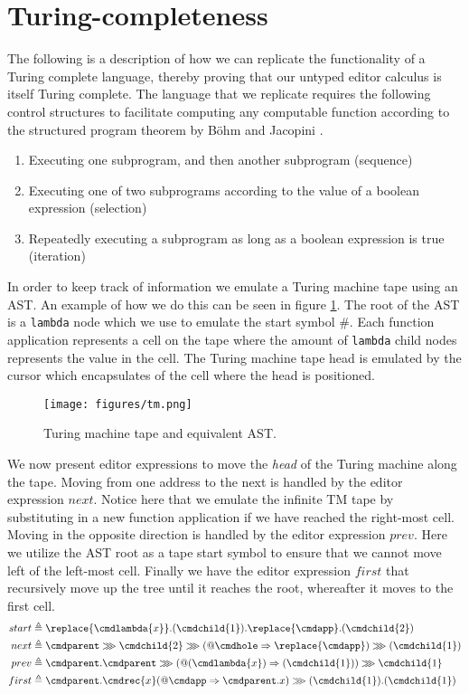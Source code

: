 \section{Turing-completeness}
The following is a description of how we can replicate the functionality of a Turing complete language, thereby proving that our untyped editor calculus is itself Turing complete. The language that we replicate requires the following control structures to facilitate computing any computable function according to the structured program theorem by Böhm and Jacopini \cite{}. 
\begin{enumerate}
    \item Executing one subprogram, and then another subprogram (sequence)
    \item Executing one of two subprograms according to the value of a boolean expression (selection)
    \item Repeatedly executing a subprogram as long as a boolean expression is true (iteration)
\end{enumerate}

In order to keep track of information we emulate a Turing machine tape using an AST. An example of how we do this can be seen in figure \ref{fig:address}. The root of the AST is a \texttt{lambda} node which we use to emulate the start symbol \#. Each function application represents a cell on the tape where the amount of \texttt{lambda} child nodes represents the value in the cell. The Turing machine tape head is emulated by the cursor which encapsulates  of the cell where the head is positioned.

\begin{figure} [H]
    \centering
    \texttt{[image: figures/tm.png]}
    \caption{Turing machine tape and equivalent AST.}
    \label{fig:address}
\end{figure}

We now present editor expressions to move the \textit{head} of the Turing machine along the tape. Moving from one address to the next is handled by the editor expression $next$. Notice here that we emulate the infinite TM tape by substituting in a new function application if we have reached the right-most cell. Moving in the opposite direction is handled by the editor expression $prev$. Here we utilize the AST root as a tape start symbol to ensure that we cannot move left of the left-most cell. Finally we have the editor expression $first$ that recursively move up the tree until it reaches the root, whereafter it moves to the first cell.
\begin{align*}
    start &\triangleq \replace{\cmdlambda{x}}.(\cmdchild{1}).\replace{\cmdapp}.(\cmdchild{2})\\
    next &\triangleq \cmdparent \ggg \cmdchild{2} \ggg (@\cmdhole \Rightarrow \replace{\cmdapp}) \ggg (\cmdchild{1}) \\
    prev &\triangleq \cmdparent.\cmdparent \ggg (@(\cmdlambda{x}) \Rightarrow (\cmdchild{1})) \ggg \cmdchild{1} \\
    first &\triangleq \cmdparent.\cmdrec{x}(@\cmdapp \Rightarrow \cmdparent.x) \ggg (\cmdchild{1}).(\cmdchild{1})
\end{align*}

